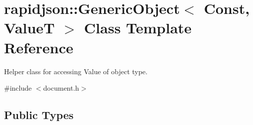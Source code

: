 \hypertarget{classrapidjson_1_1_generic_object}{}\section{rapidjson\+::Generic\+Object$<$ Const, ValueT $>$ Class Template Reference}
\label{classrapidjson_1_1_generic_object}


Helper class for accessing Value of object type.  




{\ttfamily \#include $<$document.\+h$>$}

\subsection*{Public Types}
